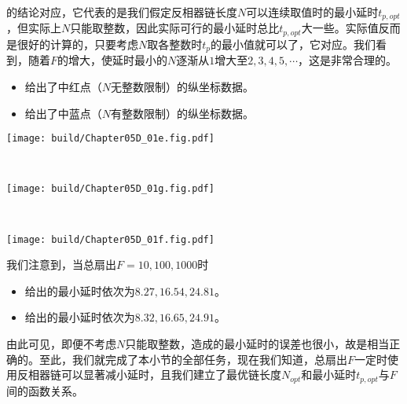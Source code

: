 的结论对应，它代表的是我们假定反相器链长度$N$可以连续取值时的最小延时$t_{p,opt}$，但实际上$N$只能取整数，因此实际可行的最小延时总比$t_{p,opt}$大一些。实际值反而是很好的计算的，只要考虑$N$取各整数时$t_p$的最小值就可以了，它对应。我们看到，随着$F$的增大，使延时最小的$N$逐渐从$1$增大至$2,3,4,5,\cdots$，这是非常合理的。
\begin{itemize}
    \item {}给出了中红点（$N$无整数限制）的纵坐标数据。
    \item {}给出了中蓝点（$N$有整数限制）的纵坐标数据。
\end{itemize}

\begin{Figure}[反相器链的最优延时]
    \begin{FigureSub}[链长度无整数限制]
        \texttt{[image: build/Chapter05D\_01e.fig.pdf]}\hspace{0.3cm}
    \end{FigureSub}\\ \vspace{1.5cm}
    \begin{FigureSub}[链长度有整数限制]
        \texttt{[image: build/Chapter05D\_01g.fig.pdf]}\hspace{0.3cm}
    \end{FigureSub}\\ \vspace{1.5cm}
    \begin{FigureSub}[链长度取各整数时的延时]
        \texttt{[image: build/Chapter05D\_01f.fig.pdf]}\hspace{0.3cm}
    \end{FigureSub}
\end{Figure}

我们注意到，当总扇出$F=10, 100, 1000$时
\begin{itemize}
    \item {}给出的最小延时依次为$8.27, 16.54, 24.81$。
    \item {}给出的最小延时依次为$8.32, 16.65, 24.91$。
\end{itemize}
由此可见，即便不考虑$N$只能取整数，造成的最小延时的误差也很小，故是相当正确的。至此，我们就完成了本小节的全部任务，现在我们知道，总扇出$F$一定时使用反相器链可以显著减小延时，且我们建立了最优链长度$N_{opt}$和最小延时$t_{p,opt}$与$F$间的函数关系。